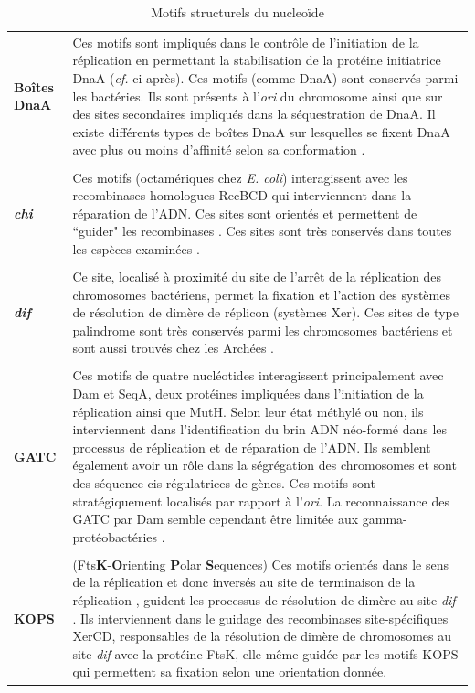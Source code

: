 \begin{longtable}{@{\hspace{-2cm}\hspace{1cm}} >{\bfseries}p{}  | >{\small}p{}}
 	 \caption{Motifs structurels du nucleoïde}\label{tabmotif}\\
	 \endfirsthead
	 Boîtes DnaA & Ces motifs sont impliqués dans le contrôle de l'initiation de la réplication en permettant la stabilisation de la protéine initiatrice DnaA (\textit{cf.} ci-après). Ces motifs (comme DnaA) sont conservés parmi les bactéries. Ils sont présents à l'\textit{ori} du chromosome ainsi que sur des sites secondaires impliqués dans la séquestration de DnaA. Il existe différents types de boîtes DnaA sur lesquelles se fixent DnaA avec plus ou moins d'affinité selon sa conformation \citep{Mott2007}.\\
	\\[-0.2cm]
	\textit{chi} & Ces motifs (octamériques chez \textit{E. coli}) interagissent avec les recombinases homologues RecBCD qui interviennent dans la réparation de l'ADN. Ces sites sont orientés et permettent de ``guider" les recombinases \citep{spies2005homologous}. Ces sites sont très conservés dans toutes les espèces examinées \citep{Touzain2011}.\\
	\\[-0.2cm]
	\textit{dif} & Ce site, localisé à proximité du site de l'arrêt de la réplication des chromosomes bactériens, permet la fixation et l'action des systèmes de résolution de dimère de réplicon (systèmes Xer). Ces sites de type palindrome sont très conservés parmi les chromosomes bactériens et sont aussi trouvés chez les Archées \citep{Carnoy2009}. \\
	\\[-0.2cm]
	 GATC & Ces motifs de quatre nucléotides interagissent principalement avec Dam et SeqA, deux protéines impliquées dans l'initiation de la réplication ainsi que MutH. Selon leur état méthylé ou non, ils interviennent dans l'identification du brin ADN néo-formé dans les processus de réplication et de réparation de l'ADN. Ils semblent également avoir un rôle dans la ségrégation des chromosomes et sont des séquence cis-régulatrices de gènes. Ces motifs sont stratégiquement localisés par rapport à l'\textit{ori}. La reconnaissance des GATC par Dam semble cependant être limitée aux gamma-protéobactéries \citep{Touzain2011}.\\
	\\[-0.2cm]
	KOPS & (Fts\textbf{K}-\textbf{O}rienting\textbf{ P}olar \textbf{S}equences) Ces motifs orientés dans le sens de la réplication et donc inversés au site de terminaison de la réplication \citep{Kono2011}, guident les processus de résolution de dimère au site \textit{dif} \citep{bigot2005kops}. Ils interviennent dans le guidage des recombinases site-spécifiques XerCD, responsables de la résolution de dimère de chromosomes au site \textit{dif} avec la protéine FtsK, elle-même guidée par les motifs KOPS qui permettent sa fixation selon une orientation donnée. \\

\end{longtable}
